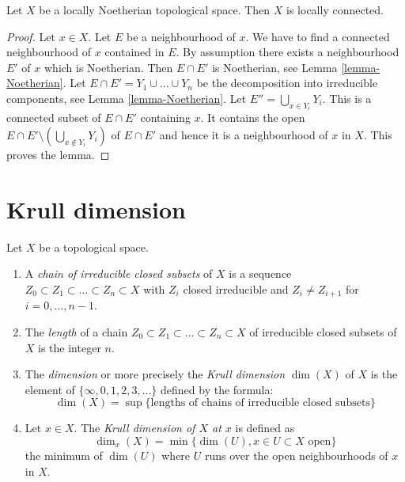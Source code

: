 \begin{lemma}
\label{lemma-locally-Noetherian-locally-connected}
Let $X$ be a locally Noetherian topological space.
Then $X$ is locally connected.
\end{lemma}

\begin{proof}
Let $x \in X$. Let $E$ be a neighbourhood of $x$.
We have to find a connected neighbourhood of $x$ contained
in $E$. By assumption there exists a neighbourhood $E'$ of $x$
which is Noetherian. Then $E \cap E'$ is Noetherian, see
Lemma \ref{lemma-Noetherian}.
Let $E \cap E' = Y_1 \cup \ldots \cup Y_n$ be the decomposition
into irreducible components, see
Lemma \ref{lemma-Noetherian}.
Let $E'' = \bigcup_{x \in Y_i} Y_i$. This is a connected
subset of $E \cap E'$ containing $x$. It contains the open
$E \cap E' \setminus (\bigcup_{x \not \in Y_i} Y_i)$ of $E \cap E'$
and hence it is a neighbourhood of $x$ in $X$. This proves the lemma.
\end{proof}



\section{Krull dimension}
\label{section-krull-dimension}

\begin{definition}
\label{definition-Krull}
Let $X$ be a topological space.
\begin{enumerate}
\item A {\it chain of irreducible closed subsets} of $X$
is a sequence $Z_0 \subset Z_1 \subset \ldots \subset Z_n \subset X$
with $Z_i$ closed irreducible and $Z_i \not= Z_{i + 1}$ for
$i = 0, \ldots, n - 1$.
\item The {\it length} of a chain
$Z_0 \subset Z_1 \subset \ldots \subset Z_n \subset X$
of irreducible closed subsets of $X$ is the
integer $n$.
\item The {\it dimension} or more precisely the
{\it Krull dimension} $\dim(X)$ of $X$ is
the element of $\{\infty, 0, 1, 2, 3, \ldots\}$ defined by the formula:
$$
\dim(X) =
\sup \{\text{lengths of chains of irreducible closed subsets}\}
$$
\item Let $x \in X$.
The {\it Krull dimension of $X$ at $x$} is defined as
$$
\dim_x(X) = \min \{\dim(U), x\in U\subset X\text{ open}\}
$$
the minimum of $\dim(U)$ where $U$ runs over the open
neighbourhoods of $x$ in $X$.
\end{enumerate}
\end{definition}

